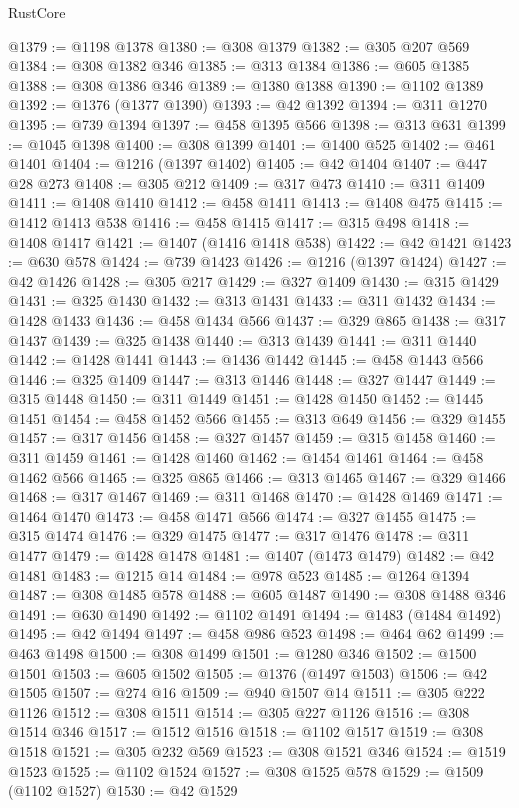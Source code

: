 \begin{lexlean}{RustCore}
\begin{coremodule}
@1379 := @1198 @1378
@1380 := @308 @1379
@1382 := @305 @207 @569
@1384 := @308 @1382 @346
@1385 := @313 @1384
@1386 := @605 @1385
@1388 := @308 @1386 @346
@1389 := @1380 @1388
@1390 := @1102 @1389
@1392 := @1376 (@1377 @1390)
@1393 := @42 @1392
@1394 := @311 @1270
@1395 := @739 @1394
@1397 := @458 @1395 @566
@1398 := @313 @631
@1399 := @1045 @1398
@1400 := @308 @1399
@1401 := @1400 @525
@1402 := @461 @1401
@1404 := @1216 (@1397 @1402)
@1405 := @42 @1404
@1407 := @447 @28 @273
@1408 := @305 @212
@1409 := @317 @473
@1410 := @311 @1409
@1411 := @1408 @1410
@1412 := @458 @1411
@1413 := @1408 @475
@1415 := @1412 @1413 @538
@1416 := @458 @1415
@1417 := @315 @498
@1418 := @1408 @1417
@1421 := @1407 (@1416 @1418 @538)
@1422 := @42 @1421
@1423 := @630 @578
@1424 := @739 @1423
@1426 := @1216 (@1397 @1424)
@1427 := @42 @1426
@1428 := @305 @217
@1429 := @327 @1409
@1430 := @315 @1429
@1431 := @325 @1430
@1432 := @313 @1431
@1433 := @311 @1432
@1434 := @1428 @1433
@1436 := @458 @1434 @566
@1437 := @329 @865
@1438 := @317 @1437
@1439 := @325 @1438
@1440 := @313 @1439
@1441 := @311 @1440
@1442 := @1428 @1441
@1443 := @1436 @1442
@1445 := @458 @1443 @566
@1446 := @325 @1409
@1447 := @313 @1446
@1448 := @327 @1447
@1449 := @315 @1448
@1450 := @311 @1449
@1451 := @1428 @1450
@1452 := @1445 @1451
@1454 := @458 @1452 @566
@1455 := @313 @649
@1456 := @329 @1455
@1457 := @317 @1456
@1458 := @327 @1457
@1459 := @315 @1458
@1460 := @311 @1459
@1461 := @1428 @1460
@1462 := @1454 @1461
@1464 := @458 @1462 @566
@1465 := @325 @865
@1466 := @313 @1465
@1467 := @329 @1466
@1468 := @317 @1467
@1469 := @311 @1468
@1470 := @1428 @1469
@1471 := @1464 @1470
@1473 := @458 @1471 @566
@1474 := @327 @1455
@1475 := @315 @1474
@1476 := @329 @1475
@1477 := @317 @1476
@1478 := @311 @1477
@1479 := @1428 @1478
@1481 := @1407 (@1473 @1479)
@1482 := @42 @1481
@1483 := @1215 @14
@1484 := @978 @523
@1485 := @1264 @1394
@1487 := @308 @1485 @578
@1488 := @605 @1487
@1490 := @308 @1488 @346
@1491 := @630 @1490
@1492 := @1102 @1491
@1494 := @1483 (@1484 @1492)
@1495 := @42 @1494
@1497 := @458 @986 @523
@1498 := @464 @62
@1499 := @463 @1498
@1500 := @308 @1499
@1501 := @1280 @346
@1502 := @1500 @1501
@1503 := @605 @1502
@1505 := @1376 (@1497 @1503)
@1506 := @42 @1505
@1507 := @274 @16
@1509 := @940 @1507 @14
@1511 := @305 @222 @1126
@1512 := @308 @1511
@1514 := @305 @227 @1126
@1516 := @308 @1514 @346
@1517 := @1512 @1516
@1518 := @1102 @1517
@1519 := @308 @1518
@1521 := @305 @232 @569
@1523 := @308 @1521 @346
@1524 := @1519 @1523
@1525 := @1102 @1524
@1527 := @308 @1525 @578
@1529 := @1509 (@1102 @1527)
@1530 := @42 @1529

\end{coremodule}
\end{lexlean}
